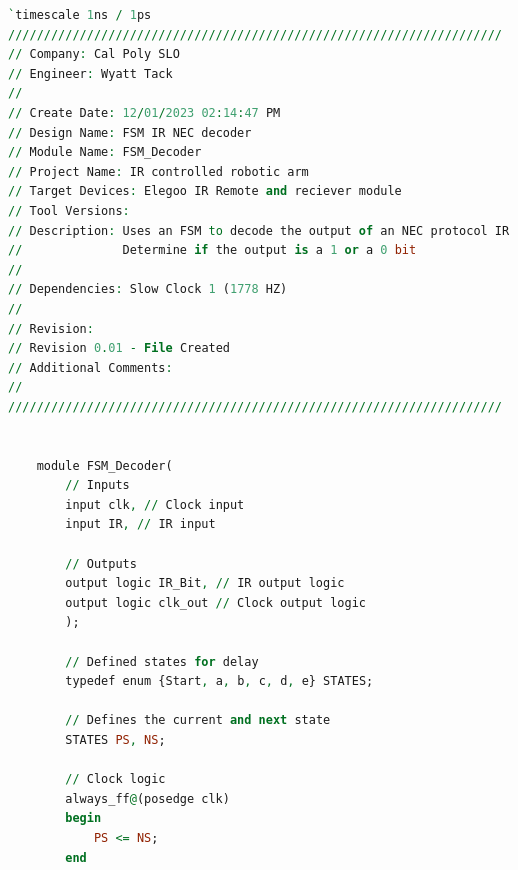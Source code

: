 \documentclass[
    a4paper, %
	12pt, %
    ]{CSSullivanBusinessReport}
\begin{document}
\begin{lstlisting}[language=VHDL]
`timescale 1ns / 1ps
/////////////////////////////////////////////////////////////////////
// Company: Cal Poly SLO
// Engineer: Wyatt Tack
// 
// Create Date: 12/01/2023 02:14:47 PM
// Design Name: FSM IR NEC decoder
// Module Name: FSM_Decoder
// Project Name: IR controlled robotic arm
// Target Devices: Elegoo IR Remote and reciever module
// Tool Versions: 
// Description: Uses an FSM to decode the output of an NEC protocol IR module to
//              Determine if the output is a 1 or a 0 bit   
//
// Dependencies: Slow Clock 1 (1778 HZ)
// 
// Revision:
// Revision 0.01 - File Created
// Additional Comments:
// 
/////////////////////////////////////////////////////////////////////
    
    
    module FSM_Decoder(
        // Inputs
        input clk, // Clock input
        input IR, // IR input
    
        // Outputs
        output logic IR_Bit, // IR output logic
        output logic clk_out // Clock output logic
        );
    
        // Defined states for delay
        typedef enum {Start, a, b, c, d, e} STATES;
        
        // Defines the current and next state
        STATES PS, NS;
    
        // Clock logic
        always_ff@(posedge clk)
        begin
            PS <= NS;
        end   
        

\end{lstlisting}
\end{document}

